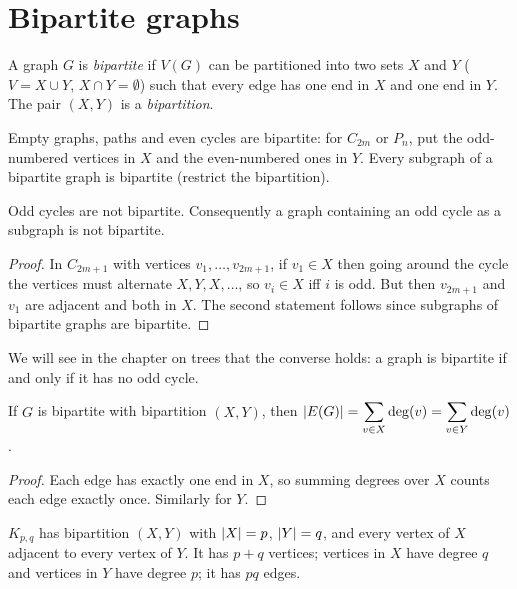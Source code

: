 \section{Bipartite graphs}

\begin{definition}[Bipartite]
A graph $G$ is \emph{bipartite} if $V(G)$ can be partitioned into two sets $X$ and $Y$
($V = X\cup Y$, $X \cap Y = \emptyset$) such that every edge has one end in $X$ and one end in
$Y$. The pair $(X,Y)$ is a \emph{bipartition}.
\end{definition}

\begin{example}
Empty graphs, paths and even cycles are bipartite: for $C_{2m}$ or $P_n$, put the odd-numbered
vertices in $X$ and the even-numbered ones in $Y$. Every subgraph of a bipartite graph is bipartite
(restrict the bipartition).
\end{example}

\begin{proposition}
Odd cycles are not bipartite. Consequently a graph containing an odd cycle as a subgraph is not
bipartite.
\end{proposition}
\begin{proof}
In $C_{2m+1}$ with vertices $v_1, \dots, v_{2m+1}$, if $v_1 \in X$ then going around the cycle
the vertices must alternate $X, Y, X, \dots$, so $v_i \in X$ iff $i$ is odd. But then $v_{2m+1}$
and $v_1$ are adjacent and both in $X$. The second statement follows since subgraphs of
bipartite graphs are bipartite.
\end{proof}

We will see in the chapter on trees that the converse holds: a graph is bipartite if and only if
it has no odd cycle.

\begin{proposition}
If $G$ is bipartite with bipartition $(X,Y)$, then
$\displaystyle \left\lvert E(G) \right\rvert = \sum_{v\in X}\deg(v) = \sum_{v\in Y}\deg(v)$.
\end{proposition}
\begin{proof}
Each edge has exactly one end in $X$, so summing degrees over $X$ counts each edge exactly once.
Similarly for $Y$.
\end{proof}

\begin{definition}
$K_{p,q}$ has bipartition $(X,Y)$ with $\left\lvert X \right\rvert = p$, $\left\lvert Y \right\rvert = q$, and every vertex of $X$
adjacent to every vertex of $Y$. It has $p+q$ vertices; vertices in $X$ have degree $q$ and
vertices in $Y$ have degree $p$; it has $pq$ edges.
\end{definition}

